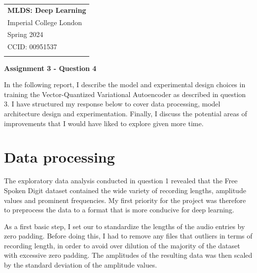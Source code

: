 \documentclass[11pt,a4paper]{article}
\begin{document}
\thispagestyle{empty} %

\begin{tabular}{p{15.5cm}} %
{\large \bf MLDS: Deep Learning} \\
Imperial College London \\ Spring 2024  \\ CCID: 00951537\\
\hline %
\\
\end{tabular} %

\vspace*{0.3cm} %

\begin{center} %
	{\Large \bf Assignment 3 - Question 4} %
\end{center}  

\vspace{0.4cm}

In the following report, I describe the model and experimental
design choices in training the Vector-Quantized Variational Autoencoder as
described in question 3. I have structured my response below to cover data
processing, model architecture design and experimentation. Finally, I discuss
the potential areas of improvements that I would have liked to explore given
more time.

\section{Data processing}

The exploratory data analysis conducted in question 1 revealed that the Free
Spoken Digit dataset contained the wide variety of recording lengths, amplitude
values and prominent frequencies. My first priority for the project was therefore
to preprocess the data to a format that is more conducive for deep learning.

As a first basic step, I set our to standardize the lengths of the audio entries
by zero padding. Before doing this, I had to remove any files that outliers in terms
of recording length, in order to avoid over dilution of the majority of the dataset
with excessive zero padding. The amplitudes of the resulting data was then scaled
by the standard deviation of the amplitude values.
\end{document}

